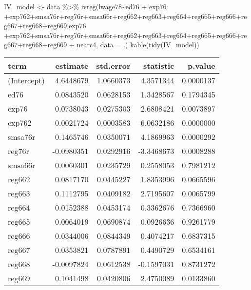 \documentclass[
]{article}
\newenvironment{Shaded}{\begin{snugshade}}{\end{snugshade}}
\newcommand{\AttributeTok}[1]{\textcolor[rgb]{0.77,0.63,0.00}{#1}}
\newcommand{\FunctionTok}[1]{\textcolor[rgb]{0.00,0.00,0.00}{#1}}
\newcommand{\NormalTok}[1]{#1}
\newcommand{\OtherTok}[1]{\textcolor[rgb]{0.56,0.35,0.01}{#1}}
\newcommand{\SpecialCharTok}[1]{\textcolor[rgb]{0.00,0.00,0.00}{#1}}
\begin{document}
\begin{Shaded}
\begin{Highlighting}[]
\NormalTok{IV\_model }\OtherTok{\textless{}{-}}\NormalTok{ data }\SpecialCharTok{\%\textgreater{}\%} \FunctionTok{ivreg}\NormalTok{(lwage78}\SpecialCharTok{\textasciitilde{}}\NormalTok{ed76 }\SpecialCharTok{+}\NormalTok{ exp76 }\SpecialCharTok{+}\NormalTok{exp762}\SpecialCharTok{+}\NormalTok{smsa76r}\SpecialCharTok{+}\NormalTok{reg76r}\SpecialCharTok{+}\NormalTok{smsa66r}\SpecialCharTok{+}\NormalTok{reg662}\SpecialCharTok{+}\NormalTok{reg663}\SpecialCharTok{+}\NormalTok{reg664}\SpecialCharTok{+}\NormalTok{reg665}\SpecialCharTok{+}\NormalTok{reg666}\SpecialCharTok{+}\NormalTok{reg667}\SpecialCharTok{+}\NormalTok{reg668}\SpecialCharTok{+}\NormalTok{reg669}\SpecialCharTok{|}\NormalTok{exp76 }\SpecialCharTok{+}\NormalTok{exp762}\SpecialCharTok{+}\NormalTok{smsa76r}\SpecialCharTok{+}\NormalTok{reg76r}\SpecialCharTok{+}\NormalTok{smsa66r}\SpecialCharTok{+}\NormalTok{reg662}\SpecialCharTok{+}\NormalTok{reg663}\SpecialCharTok{+}\NormalTok{reg664}\SpecialCharTok{+}\NormalTok{reg665}\SpecialCharTok{+}\NormalTok{reg666}\SpecialCharTok{+}\NormalTok{reg667}\SpecialCharTok{+}\NormalTok{reg668}\SpecialCharTok{+}\NormalTok{reg669 }\SpecialCharTok{+}\NormalTok{ nearc4, }\AttributeTok{data =}\NormalTok{ .)}
\FunctionTok{kable}\NormalTok{(}\FunctionTok{tidy}\NormalTok{(IV\_model))}
\end{Highlighting}
\end{Shaded}

\begin{longtable}[]{@{}lrrrr@{}}
\toprule
term & estimate & std.error & statistic & p.value \\
\midrule
\endhead
(Intercept) & 4.6448679 & 1.0660373 & 4.3571344 & 0.0000137 \\
ed76 & 0.0843520 & 0.0628153 & 1.3428567 & 0.1794345 \\
exp76 & 0.0738043 & 0.0275303 & 2.6808421 & 0.0073897 \\
exp762 & -0.0021724 & 0.0003583 & -6.0632186 & 0.0000000 \\
smsa76r & 0.1465746 & 0.0350071 & 4.1869963 & 0.0000292 \\
reg76r & -0.0980351 & 0.0292916 & -3.3468673 & 0.0008288 \\
smsa66r & 0.0060301 & 0.0235729 & 0.2558053 & 0.7981212 \\
reg662 & 0.0817170 & 0.0445227 & 1.8353996 & 0.0665596 \\
reg663 & 0.1112795 & 0.0409182 & 2.7195607 & 0.0065799 \\
reg664 & 0.0152388 & 0.0453174 & 0.3362676 & 0.7366960 \\
reg665 & -0.0064019 & 0.0690874 & -0.0926636 & 0.9261779 \\
reg666 & 0.0344006 & 0.0844349 & 0.4074217 & 0.6837315 \\
reg667 & 0.0353821 & 0.0787891 & 0.4490729 & 0.6534161 \\
reg668 & -0.0097824 & 0.0612538 & -0.1597031 & 0.8731272 \\
reg669 & 0.1041498 & 0.0420806 & 2.4750089 & 0.0133860 \\
\bottomrule
\end{longtable}
\end{document}
